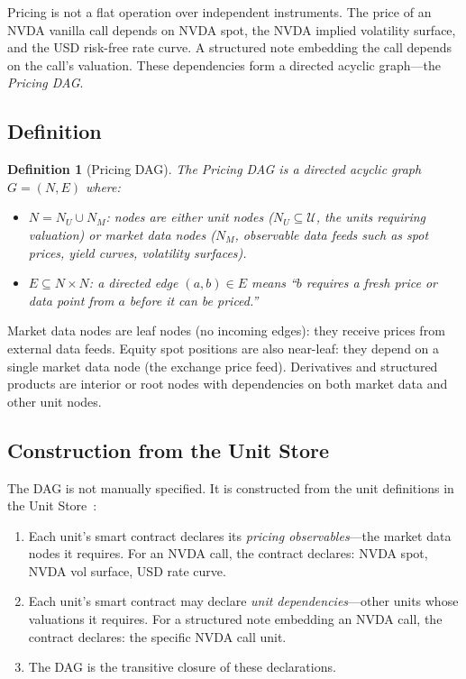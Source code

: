 \documentclass[11pt,a4paper]{article}
\newtheorem{definition}{Definition}[section]
\begin{document}
Pricing is not a flat operation over independent instruments.  The price of an NVDA vanilla call depends on NVDA spot, the NVDA implied volatility surface, and the USD risk-free rate curve.  A structured note embedding the call depends on the call's valuation.  These dependencies form a directed acyclic graph---the \emph{Pricing DAG}.

\subsection{Definition}

\begin{definition}[Pricing DAG]
\label{def:pricing-dag}
The \emph{Pricing DAG} is a directed acyclic graph $G = (N, E)$ where:
\begin{itemize}[nosep]
\item $N = N_U \cup N_M$: nodes are either unit nodes ($N_U \subseteq \mathcal{U}$, the units requiring valuation) or market data nodes ($N_M$, observable data feeds such as spot prices, yield curves, volatility surfaces).
\item $E \subseteq N \times N$: a directed edge $(a, b) \in E$ means ``$b$ requires a fresh price or data point from $a$ before it can be priced.''
\end{itemize}
\end{definition}

\noindent Market data nodes are leaf nodes (no incoming edges): they receive prices from external data feeds.  Equity spot positions are also near-leaf: they depend on a single market data node (the exchange price feed).  Derivatives and structured products are interior or root nodes with dependencies on both market data and other unit nodes.

\subsection{Construction from the Unit Store}

The DAG is not manually specified.  It is constructed from the unit definitions in the Unit Store~\cite[\S3]{ledger}:

\begin{enumerate}[nosep]
\item Each unit's smart contract declares its \emph{pricing observables}---the market data nodes it requires.  For an NVDA call, the contract declares: NVDA spot, NVDA vol surface, USD rate curve.
\item Each unit's smart contract may declare \emph{unit dependencies}---other units whose valuations it requires.  For a structured note embedding an NVDA call, the contract declares: the specific NVDA call unit.
\item The DAG is the transitive closure of these declarations.
\end{enumerate}
\end{document}
